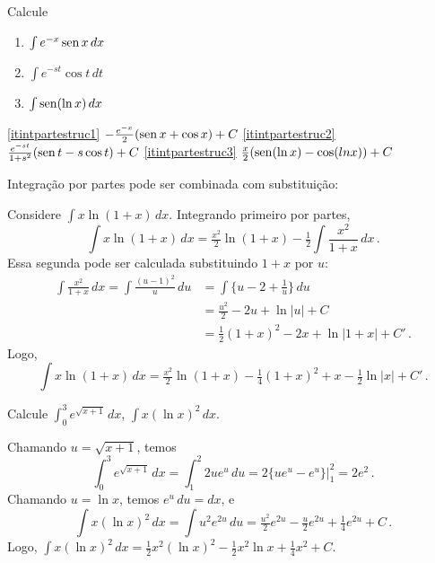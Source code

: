 \begin{exo}\label{Exo:porpartesmach}
Calcule 
\begin{multicols}{3}
\begin{enumerate}
\item\label{itintpartestruc1} $\int e^{-x}\operatorname{sen} x\,dx$
\item\label{itintpartestruc2} $\int e^{-st}\cos t\,dt$
\item\label{itintpartestruc3} $\int \operatorname{sen} (\ln x)\,dx$
\end{enumerate}
\end{multicols}
\vspace{0.01cm}
\begin{sol}
\eqref{itintpartestruc1} $-\frac{e^{-x}}{2}(\operatorname{sen} x+\cos x)+C$
\eqref{itintpartestruc2} $\frac{e^{-st}}{1+s^2}(\operatorname{sen} t- s\cos t)+C$
\eqref{itintpartestruc3} $\frac{x}{2}(\operatorname{sen} (\ln x)-\cos (ln x))+C$
\end{sol}
\end{exo}

Integração por partes pode ser combinada com substituição:

\begin{ex}
Considere $\int x\ln(1+x)\,dx$. Integrando primeiro por partes,
$$
\int x\ln(1+x)\,dx=\tfrac{x^2}{2}\ln(1+x)-\tfrac{1}{2}\int \frac{x^2}{1+x}\,dx\,.
$$
Essa segunda pode ser calculada substituindo $1+x$ por $u$:
\begin{align*}
\int\frac{x^2}{1+x}\,dx=\int\frac{(u-1)^2}{u}\,du&=
\int\{u-2+\tfrac1u\}\,du\\
&=\tfrac{u^2}{2}-2u+\ln|u|+C\\
&=\tfrac12(1+x)^2-2x+\ln|1+x|+C'\,.
\end{align*}
Logo,
$$
\int x\ln (1+x)\,dx=\tfrac{x^2}{2}\ln(1+x)-\tfrac14(1+x)^2
+x-\tfrac12\ln |x|+C'\,.
$$
\end{ex}

\begin{exo}\label{Exo:Bonnardpartessubsit}
Calcule $\int_0^3e^{\sqrt{x+1}}\,dx$, $\int x(\ln x)^2\,dx$.
\begin{sol}
Chamando $u=\sqrt{x+1}$, temos 
$$
\int_0^3e^{\sqrt{x+1}}\,dx=\int_1^2
2ue^u\,du=2\bigl\{ue^u-e^u\bigr\}\big|_1^2=2e^2\,.
$$
Chamando $u=\ln x$, temos $e^u\,du=dx$, e
$$
\int x(\ln x)^2\,dx=\int
u^2e^{2u}\,du=\tfrac{u^2}{2}e^{2u}-\tfrac{u}{2}e^{2u}+\tfrac14 e^{2u}+C\,.
$$
Logo, $\int x(\ln x)^2\,dx=\tfrac12 x^2(\ln x)^2-\tfrac12 x^2\ln
x+\tfrac14x^2+C$. 
\end{sol}
\end{exo}




